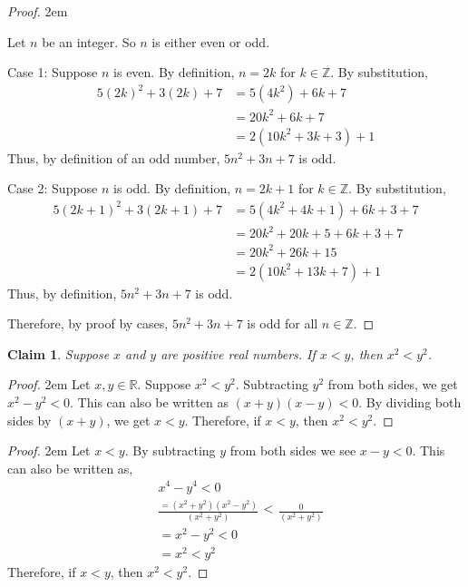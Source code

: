 \documentclass[12 pt]{article}
\newcommand{\R}{\mathbb{R}}
\newcommand{\Z}{\mathbb{Z}}
\theoremstyle{definition}
\theoremstyle{plain}
\theoremstyle{mytheorem}
\newtheorem{claim}{Claim}
\theoremstyle{myexample}
\theoremstyle{mydefinition}
\begin{document}
\begin{center} \underline{\hspace{\textwidth}} \end{center}

\begin{proof} \openup 2em{ Let $n$ be an integer.  So $n$ is either even or odd.
\begin{description}
\item{Case 1:} Suppose $n$ is even.  By definition, $n=2k$ for $k \in \Z$.  By substitution,
	\begin{align*}  5(2k)^2+3(2k)+7 &= 5(4k^2)+6k+7\\
		\ &= 20k^2+6k+7\\
		\ &= 2(10k^2+3k+3)+1
	\end{align*}
	Thus, by definition of an odd number, $5n^2+3n+7$ is odd.
\item {Case 2:}  Suppose $n$ is odd.  By definition, $n=2k+1$ for $k \in \Z$.  By substitution, 
	\begin{align*} 5(2k+1)^2+3(2k+1)+7 &= 5(4k^2+4k+1)+6k+3+7\\
	\ &= 20k^2+20k+5+6k+3+7\\
	\ &= 20k^2+26k+15\\
	\ &= 2(10k^2+13k+7)+1
	\end{align*}
	Thus, by definition, $5n^2+3n+7$ is odd.
\end{description}
Therefore, by proof by cases, $5n^2+3n+7$ is odd for all $n \in \Z$.}
\end{proof}

\newpage

\begin{claim}
Suppose $x$ and $y$ are positive real numbers.  If $x<y$, then $x^2<y^2$.
\end{claim}

\begin{proof}
\openup 2em {Let $x,y \in \R$.  Suppose $x^2<y^2$.  Subtracting $y^2$ from both sides, we get $x^2-y^2<0$.  This can also be written as $(x+y)(x-y)<0.$  By dividing both sides by $(x+y)$, we get $x<y$.  Therefore, if $x<y$, then $x^2<y^2$.}
\end{proof}

\begin{center} \underline{\hspace{\textwidth}} \end{center}

\begin{proof}
\openup 2em {Let $x<y$.  By subtracting $y$ from both sides we see $x-y<0$.  This can also be written as,
	\begin{align*}
	& x^4-y^4<0\\
	& \frac{=(x^2+y^2)(x^2-y^2)}{(x^2+y^2)} \begin{array}{c} < \\ \ \end{array} \frac{0}{(x^2+y^2)}\\
	&= x^2-y^2 <0\\
	&=x^2<y^2
	\end{align*}
	Therefore, if $x<y$, then $x^2<y^2$.}
\end{proof}
\end{document}
